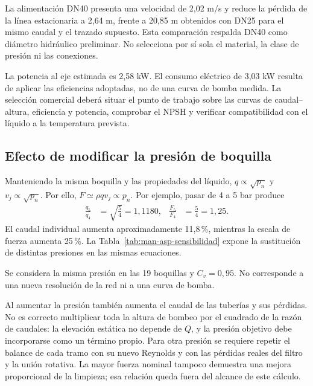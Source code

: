 La alimentación DN40 presenta una velocidad de 2,02 m/s y reduce la
pérdida de la línea estacionaria a 2,64 m, frente a 20,85 m obtenidos
con DN25 para el mismo caudal y el trazado supuesto. Esta comparación
respalda DN40 como diámetro hidráulico preliminar. No selecciona por
sí sola el material, la clase de presión ni las conexiones.

La potencia al eje estimada es 2,58 kW. El consumo eléctrico de 3,03 kW
resulta de aplicar las eficiencias adoptadas, no de una curva de bomba
medida. La selección comercial deberá situar el punto de trabajo sobre
las curvas de caudal--altura, eficiencia y potencia, comprobar el
NPSH y verificar compatibilidad con el líquido a la temperatura prevista.

\subsection{Efecto de modificar la presión de boquilla}
\label{sec:man-asp-sensibilidad}

Manteniendo la misma boquilla y las propiedades del líquido,
$q\propto\sqrt{p_n}$ y $v_j\propto\sqrt{p_n}$. Por ello,
$F\simeq\rho qv_j\propto p_n$. Por ejemplo, pasar de 4 a 5 bar produce
\begin{align}
 \frac{q_5}{q_4}&=\sqrt{\frac54}=1{,}1180,
 &\frac{F_5}{F_4}&=\frac54=1{,}25.
\end{align}
El caudal individual aumenta aproximadamente 11,8\,\%, mientras la
escala de fuerza aumenta 25\,\%. La Tabla~\ref{tab:man-asp-sensibilidad}
expone la sustitución de distintas presiones en las mismas ecuaciones.

\begin{table}[htbp]
\centering\small
\caption{Sensibilidad de las boquillas a una presión uniforme impuesta.}
\label{tab:man-asp-sensibilidad}

\par\smallskip\footnotesize
Se considera la misma presión en las 19 boquillas y $C_v=0{,}95$.
No corresponde a una nueva resolución de la red ni a una curva de bomba.
\end{table}

Al aumentar la presión también aumenta el caudal de las tuberías y sus
pérdidas. No es correcto multiplicar toda la altura de bombeo por el
cuadrado de la razón de caudales: la elevación estática no depende de
$Q$, y la presión objetivo debe incorporarse como un término propio.
Para otra presión se requiere repetir el balance de cada tramo con su
nuevo Reynolds y con las pérdidas reales del filtro y la unión rotativa.
La mayor fuerza nominal tampoco demuestra una mejora proporcional de
la limpieza; esa relación queda fuera del alcance de este cálculo.

